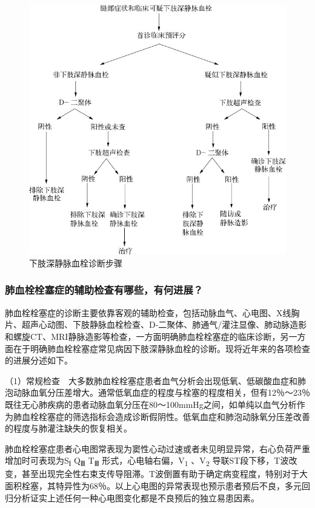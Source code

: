 \begin{figure}[!htbp]
 \centering
 \includegraphics{./images/Image00125.jpg}
 \captionsetup{justification=centering}
 \caption{下肢深静脉血栓诊断步骤}
 \label{fig16-1}
  \end{figure} 

\subsubsection{肺血栓栓塞症的辅助检查有哪些，有何进展？}

肺血栓栓塞症的诊断主要依靠客观的辅助检查，包括动脉血气、心电图、X线胸片、超声心动图、下肢静脉血栓检查、D-二聚体、肺通气/灌注显像、肺动脉造影和螺旋CT、MRI静脉造影等检查，一方面明确肺血栓栓塞症的临床诊断，另一方面在于明确肺血栓栓塞症常见病因下肢深静脉血栓的诊断。现将近年来的各项检查的进展分述如下。

（1）常规检查　大多数肺血栓栓塞症患者血气分析会出现低氧、低碳酸血症和肺泡动脉血氧分压差增大。通常低氧血症的程度与栓塞的程度相关，但有12％～23％既往无心肺疾病的患者动脉血氧分压在80～100mmHg之间，如单纯以血气分析作为肺血栓栓塞症的筛选指标会造成诊断假阴性。低氧血症和肺泡动脉氧分压差改善的程度与肺灌注缺失的恢复相关。

肺血栓栓塞症患者心电图常表现为窦性心动过速或者未见明显异常，右心负荷严重增加时可表现为S\textsubscript{Ⅰ}
Q\textsubscript{Ⅲ} T\textsubscript{Ⅲ}
形式，心电轴右偏，V\textsubscript{1} 、V\textsubscript{2}
导联ST段下移，T波改变，甚至出现完全性右束支传导阻滞。T波倒置有助于确定病变程度，特别对于大面积栓塞，其特异性为68％。以上心电图的异常表现也预示患者预后不良，多元回归分析证实上述任何一种心电图变化都是不良预后的独立易患因素。

